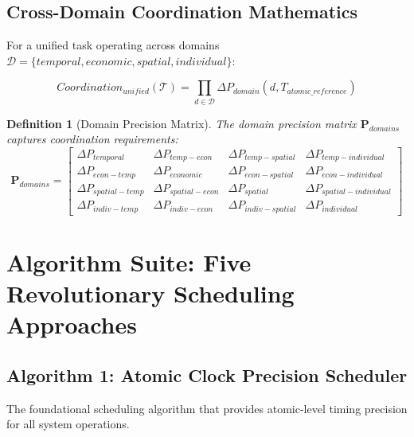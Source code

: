 \documentclass[12pt,a4paper]{article}
\newtheorem{definition}[theorem]{Definition}
\begin{document}
\subsection{Cross-Domain Coordination Mathematics}

For a unified task operating across domains $\mathcal{D} = \{temporal, economic, spatial, individual\}$:

\begin{equation}
Coordination_{unified}(\mathcal{T}) = \prod_{d \in \mathcal{D}} \Delta P_{domain}(d, T_{atomic\_reference})
\end{equation}

\begin{definition}[Domain Precision Matrix]
The domain precision matrix $\mathbf{P}_{domains}$ captures coordination requirements:
\begin{equation}
\mathbf{P}_{domains} = \begin{bmatrix}
\Delta P_{temporal} & \Delta P_{temp-econ} & \Delta P_{temp-spatial} & \Delta P_{temp-individual} \\
\Delta P_{econ-temp} & \Delta P_{economic} & \Delta P_{econ-spatial} & \Delta P_{econ-individual} \\
\Delta P_{spatial-temp} & \Delta P_{spatial-econ} & \Delta P_{spatial} & \Delta P_{spatial-individual} \\
\Delta P_{indiv-temp} & \Delta P_{indiv-econ} & \Delta P_{indiv-spatial} & \Delta P_{individual}
\end{bmatrix}
\end{equation}
\end{definition}

\section{Algorithm Suite: Five Revolutionary Scheduling Approaches}

\subsection{Algorithm 1: Atomic Clock Precision Scheduler}

The foundational scheduling algorithm that provides atomic-level timing precision for all system operations.
\end{document}
